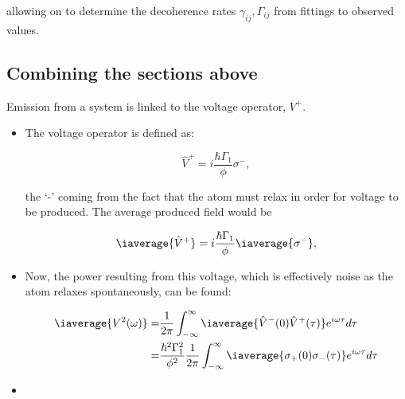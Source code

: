 \noindent   allowing   on   to    determine   the   decoherence   rates
$ \gamma_{ij}, \Gamma_{ij} $ from fittings to observed values.


\subsection{Combining the sections above}
Emission from a system is linked to the voltage operator, $ V^{+} $.
\begin{itemize}
\item The voltage operator is defined as:

  \begin{equation}\label{feb22018}
    \hat{V}^{+} = i\frac{\hbar\Gamma_1}{\phi}\sigma^{-},
  \end{equation}

  \noindent the  `-' coming from the  fact that the atom  must relax in
  order for voltage to be produced. The average produced field would be

  \[
    \iaverage{\hat{V}^{+}}                                            =
    i\frac{\hbar\Gamma_1}{\phi}\iaverage{\sigma^{-}},
  \]

\item Now, the power resulting  from this voltage, which is effectively
  noise as the atom relaxes spontaneously, can be found:

  \begin{equation}\label{feb22018:1}
    \begin{aligned}
      \iaverage{V^2(\omega)} = & \frac{1}{2\pi}\int_{-\infty}^{\infty}\iaverage{\hat{V}^{-}(0)\hat{V}^{+}(\tau)}e^{i\omega \tau}d\tau\\
      =                                                               &
      \frac{\hbar^2\Gamma_1^{2}}{\phi^2}\frac{1}{2\pi}\int_{-\infty}^{\infty}\iaverage{\sigma_{+}(0)\sigma_{-}(\tau)}e^{i\omega
        \tau}d\tau
    \end{aligned}
  \end{equation}

\item {}


\end{itemize}
